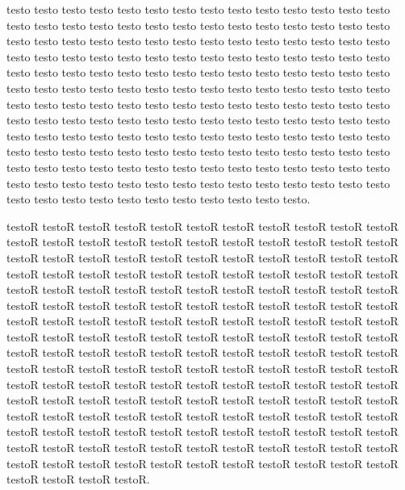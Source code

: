 \documentclass[11pt,a4paper]{book}
\begin{document}
\begin{pages}
\begin{Leftside}
\pstart testo testo testo testo testo testo testo testo testo testo testo testo testo testo testo testo testo testo testo testo testo testo testo testo testo testo testo testo testo testo testo testo testo testo testo testo testo testo testo testo testo testo testo testo testo testo testo testo testo testo testo testo testo testo testo testo testo testo testo testo testo testo testo testo testo testo testo testo testo testo testo testo testo testo testo testo testo testo testo testo testo testo testo testo testo testo testo testo testo testo testo testo testo testo testo testo testo testo testo testo testo testo testo testo testo testo testo testo testo testo testo testo testo testo testo testo testo testo testo testo testo testo testo testo testo testo testo testo testo testo testo testo testo testo testo testo testo testo testo testo testo testo testo testo testo testo testo testo testo testo testo testo testo testo testo testo testo testo testo testo testo testo testo testo testo testo testo testo testo testo testo testo testo testo testo testo testo testo testo.\pend

\endnumbering
\end{Leftside}

\begin{Rightside}
\beginnumbering
\pstart {} testoR testoR testoR testoR testoR testoR testoR testoR testoR testoR testoR testoR testoR testoR testoR testoR testoR testoR testoR testoR testoR testoR testoR testoR testoR testoR testoR testoR testoR testoR testoR testoR testoR testoR testoR testoR testoR testoR testoR testoR testoR testoR testoR testoR testoR testoR testoR testoR testoR testoR testoR testoR testoR testoR testoR testoR testoR testoR testoR testoR testoR testoR testoR testoR testoR testoR testoR testoR testoR testoR testoR testoR testoR testoR testoR testoR testoR testoR testoR testoR testoR testoR testoR testoR testoR testoR testoR testoR testoR testoR testoR testoR testoR testoR testoR testoR testoR testoR testoR testoR testoR testoR testoR testoR testoR testoR testoR testoR testoR testoR testoR testoR testoR testoR testoR testoR testoR testoR testoR testoR testoR testoR testoR testoR testoR testoR testoR testoR testoR testoR testoR testoR testoR testoR testoR testoR testoR testoR testoR testoR testoR testoR testoR testoR testoR testoR testoR testoR testoR testoR testoR testoR testoR testoR testoR testoR testoR testoR testoR testoR testoR testoR testoR testoR testoR testoR testoR testoR testoR testoR testoR testoR testoR testoR testoR testoR testoR testoR testoR testoR.\pend


\end{Rightside}
\end{pages}
\end{document}
